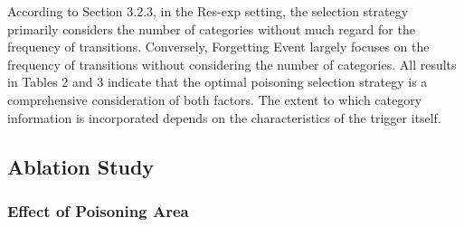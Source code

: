 \documentclass{article}
\begin{document}
According to Section 3.2.3, in the Res-exp setting, the selection strategy primarily considers the number of categories without much regard for the frequency of transitions. Conversely, Forgetting Event largely focuses on the frequency of transitions without considering the number of categories. All results in Tables 2 and 3 indicate that the optimal poisoning selection strategy is a comprehensive consideration of both factors. The extent to which category information is incorporated depends on the characteristics of the trigger itself.

\subsection{Ablation Study}
\subsubsection{Effect of Poisoning Area}
\end{document}
